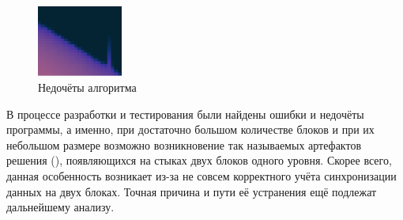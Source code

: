 \begin{figure}
    \begin{center}
        \includegraphics[width=0.25\textwidth, height=0.4\textheight, keepaspectratio]{Теория_блочных_локально_адаптивных_сеток/Результаты_моделирования/artifact.png}
    \end{center}
    \caption{Недочёты алгоритма}
    \label{fig:artifacts}
\end{figure}
В процессе разработки и тестирования были найдены ошибки и недочёты программы, а именно, при достаточно большом количестве блоков и при их небольшом размере возможно возникновение так называемых артефактов решения (), появляющихся на стыках двух блоков одного уровня.
Скорее всего, данная особенность возникает из-за не совсем корректного учёта синхронизации данных на двух блоках.
Точная причина и пути её устранения ещё подлежат дальнейшему анализу.